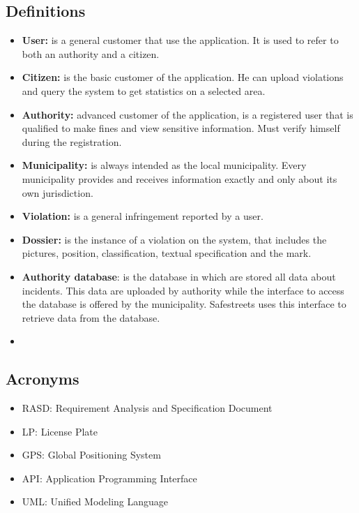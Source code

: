 \documentclass[../RASD.tex]{subfiles}
\begin{document}
    \subsection{Definitions}\label{subsec:definitions}
    \begin{itemize}
        \item \textbf{User:} is a general customer that use the application.
        It is used to refer to both an authority and a citizen.
        \item \textbf{Citizen:} is the basic customer of the application.
        He can upload violations and query the system to get statistics on a selected area.
        \item \textbf{Authority:} advanced customer of the application, is a registered user that is qualified to make fines and view sensitive information.
        Must verify himself during the registration.
        \item \textbf{Municipality:} is always intended as the local municipality.
        Every municipality provides and receives information exactly and only about its own jurisdiction.
        \item \textbf{Violation:} is a general infringement reported by a user.
        \item  \textbf{Dossier:} is the instance of a violation on the system, that includes the pictures, position, classification, textual specification and the mark.
        \item \textbf{Authority database}: is the database in which are stored all data about incidents.
        This data are uploaded by authority while the interface to access the database is offered by the municipality.
        Safestreets uses this interface to retrieve data from the database.
        \item
    \end{itemize}

    \subsection{Acronyms}\label{subsec:acronyms}
    \begin{itemize}
        \item RASD: Requirement Analysis and Specification Document
        \item LP: License Plate
        \item GPS: Global Positioning System
        \item API: Application Programming Interface
        \item UML: Unified Modeling Language
    \end{itemize}
\end{document}
